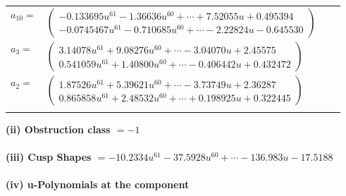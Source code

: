 \documentclass[1p]{elsarticle_modified}
\theoremstyle{definition}
\begin{document}
\begin{tabular}{m{7pt} m{180pt} m{7pt} m{180pt} }
\flushright $a_{10}=$&$\begin{pmatrix}-0.133695 u^{61}-1.36636 u^{60}+\cdots+7.52055 u+0.495394\\-0.0745467 u^{61}-0.710685 u^{60}+\cdots-2.22824 u-0.645530\end{pmatrix}$ \\
\flushright $a_{3}=$&$\begin{pmatrix}3.14078 u^{61}+9.08276 u^{60}+\cdots-3.04070 u+2.45575\\0.541059 u^{61}+1.40800 u^{60}+\cdots-0.406442 u+0.432472\end{pmatrix}$ \\
\flushright $a_{2}=$&$\begin{pmatrix}1.87526 u^{61}+5.39621 u^{60}+\cdots-3.73749 u+2.36287\\0.865858 u^{61}+2.48532 u^{60}+\cdots+0.198925 u+0.322445\end{pmatrix}$\\&\end{tabular}
\flushleft \textbf{(ii) Obstruction class $= -1$}\\~\\
\flushleft \textbf{(iii) Cusp Shapes $= -10.2334 u^{61}-37.5928 u^{60}+\cdots-136.983 u-17.5188$}\\~\\
\newpage\renewcommand{\arraystretch}{1}
\flushleft \textbf{(iv) u-Polynomials at the component}\newline \\
\end{document}
